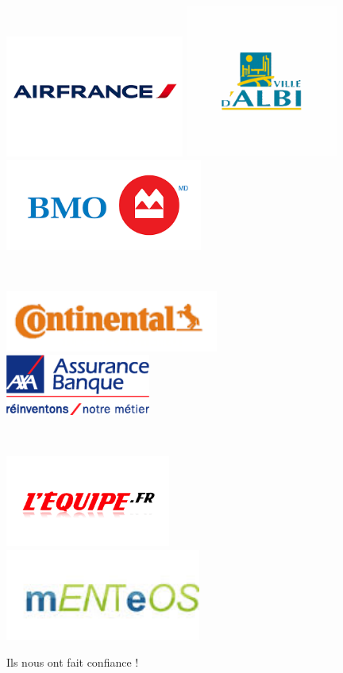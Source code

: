 \begin{figure}
\centering
\includegraphics[height=4cm]{images/chap1/airfrance}
\includegraphics[height=5cm]{images/chap1/albi}
\includegraphics[height=3cm]{images/chap1/banqueMontreal}

~

\includegraphics[height=2cm]{images/chap1/continental}
\includegraphics[height=2cm]{images/chap1/logo-axa}

~

\includegraphics[height=3cm]{images/chap1/equipe}
\includegraphics[height=3cm]{images/chap1/mentos}
\caption{Ils nous ont fait confiance !}
\label{fig:references}
\end{figure}

